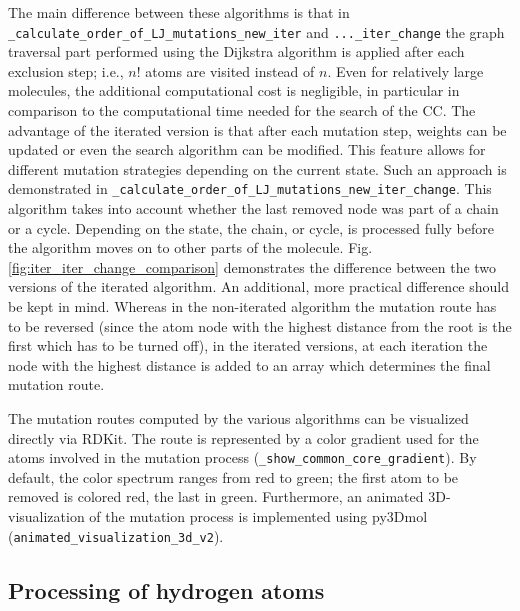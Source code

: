 The main difference between these algorithms is that in \texttt{\_calculate\_order\_of\_LJ\_mutations\_new\_iter}
and \texttt{...\_iter\_change} the graph traversal part performed
using the Dijkstra algorithm is applied after each exclusion step; i.e., $n!$ atoms are visited instead of $n$. Even for relatively large molecules, the additional computational cost is negligible, in particular in comparison
to the computational time needed for the search of the CC.
The advantage of the iterated version is that after each mutation step, weights can be
updated or even the search algorithm can be modified. 
This feature allows for different mutation strategies depending
on the current state. Such an approach is demonstrated in \texttt{\_calculate\_order\_of\_LJ\_mutations\_new\_iter\_change}.
This algorithm takes into account whether the last removed node was part of a chain or a cycle. Depending
on the state, the chain, or cycle, is processed fully before the algorithm
moves on to other parts of the molecule. Fig. \ref{fig:iter_iter_change_comparison} demonstrates the difference between the two versions of the iterated algorithm. An additional, more practical difference should be kept in mind.
Whereas in the non-iterated algorithm the mutation route has to be reversed (since the atom node with the highest distance from the root is the first which has to be turned off), in the iterated versions, at each iteration the node with the highest distance is added to an array which determines the final mutation route.

The mutation routes computed by the various algorithms can be visualized directly via RDKit. 
The route is represented by a color gradient used for the atoms involved
in the mutation process (\texttt{\_show\_common\_core\_gradient}). By default, the color spectrum ranges from red to green; the first atom to be removed is colored red, the last in green. 
Furthermore, an animated 3D-visualization of the mutation process
is implemented using py3Dmol (\texttt{animated\_visualization\_3d\_v2})\cite{key-4}. 

\clearpage

\subsection{Processing of hydrogen atoms}


